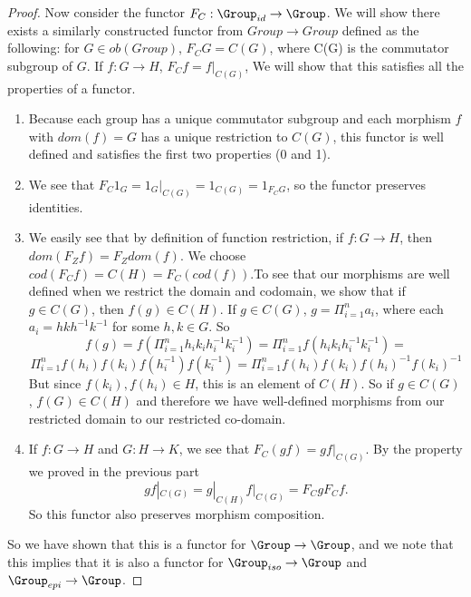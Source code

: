 \documentclass[main.tex]{subfiles}
\begin{document}
\begin{proof}
Now consider the functor $F_C:  \Group_{id} \rightarrow \Group$. We will show there exists a similarly constructed functor from $Group \rightarrow Group$ defined as the following: for $G \in ob(Group)$, $F_CG = C(G)$, where C(G) is the commutator subgroup of $G$. If $f : G \rightarrow H$, $F_Cf = f|_{C(G)}$, We will show that this satisfies all the properties of a functor.
\begin{enumerate}
    \item Because each group has a unique commutator subgroup and each morphism $f$ with $dom(f) = G$ has a unique restriction to $C(G)$, this functor is well defined and satisfies the first two properties (0 and 1).
    \item We see that $F_{C} 1_{G} = 1_{G}|_{C(G)} = 1_{C(G)} = 1_{F_{C}G}$, so the functor preserves identities. 
    \item We easily see that by definition of function restriction, if $f: G \rightarrow H$, then $dom(F_{Z}f) = F_{Z}dom(f)$. We choose $cod(F_{C}f) = C(H) = F_C(cod(f))$.To see that our morphisms are well defined when we restrict the domain and codomain, we show that if $g \in C(G)$, then $f(g) \in C(H)$. If $g \in C(G)$, $g = \Pi_{i = 1}^{n} a_i$, where each $a_i = hkh^{-1}k^{-1}$ for some $h,k \in G$. So $$f(g) = f(\Pi_{i = 1}^{n} h_ik_ih_i^{-1}k_i^{-1}) = \Pi_{i = 1}^{n} f(h_ik_ih_i^{-1}k_i^{-1}) =$$ $$  \Pi_{i = 1}^{n} f(h_i)f(k_i)f(h_i^{-1})f(k_i^{-1}) = \Pi_{i = 1}^{n} f(h_i)f(k_i)f(h_i)^{-1}f(k_i)^{-1}$$ But since $f(k_i), f(h_i) \in H$, this is an element of $C(H)$. So if $g \in C(G)$, $f(G) \in C(H)$ and therefore we have well-defined morphisms from our restricted domain to our restricted co-domain. 
    \item If $f:G \rightarrow H$ and $G: H \rightarrow K$, we see that $F_C(gf) = gf|_{C(G)}$. By the property we proved in the previous part \[gf|_{C(G)} = g|_{C(H)}f|_{C(G)} = F_CgF_Cf.\] So this functor also preserves morphism composition.
\end{enumerate}

So we have shown that this is a functor for $\Group \rightarrow \Group$, and we note that this implies that it is also a functor for $\Group_{iso} \rightarrow \Group$ and $\Group _{epi} \rightarrow \Group$. 


\end{proof}
\end{document}
